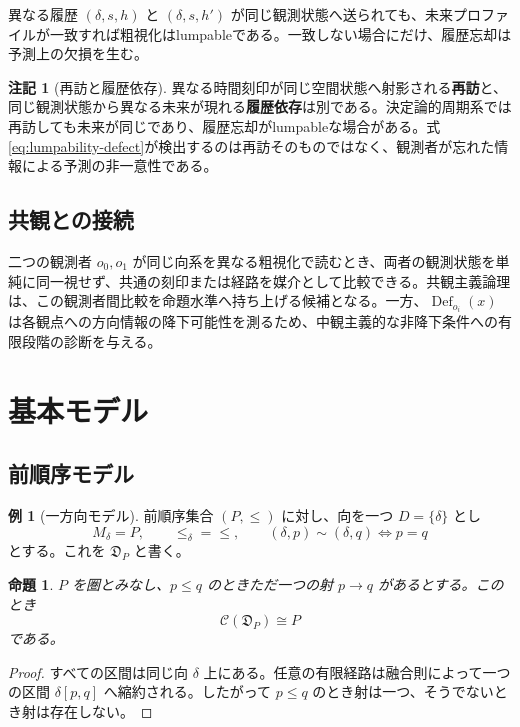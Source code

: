 \documentclass[a4paper,11pt]{ltjsarticle}
\theoremstyle{definition}
\newtheorem{remark}[definition]{注記}
\newtheorem{example}[definition]{例}
\theoremstyle{plain}
\newtheorem{proposition}[definition]{命題}
\newcommand{\Def}{\operatorname{Def}}
\begin{document}
異なる履歴 $(\delta,s,h)$ と $(\delta,s,h')$ が同じ観測状態へ送られても、未来プロファイルが一致すれば粗視化はlumpableである。一致しない場合にだけ、履歴忘却は予測上の欠損を生む。

\begin{remark}[再訪と履歴依存]
異なる時間刻印が同じ空間状態へ射影される\textbf{再訪}と、同じ観測状態から異なる未来が現れる\textbf{履歴依存}は別である。決定論的周期系では再訪しても未来が同じであり、履歴忘却がlumpableな場合がある。式\eqref{eq:lumpability-defect}が検出するのは再訪そのものではなく、観測者が忘れた情報による予測の非一意性である。
\end{remark}

\subsection{共観との接続}

二つの観測者 $o_0,o_1$ が同じ向系を異なる粗視化で読むとき、両者の観測状態を単純に同一視せず、共通の刻印または経路を媒介として比較できる。共観主義論理は、この観測者間比較を命題水準へ持ち上げる候補となる。一方、$\Def_{o_i}(x)$ は各観点への方向情報の降下可能性を測るため、中観主義的な非降下条件への有限段階の診断を与える。

\section{基本モデル}

\subsection{前順序モデル}

\begin{example}[一方向モデル]
前順序集合 $(P,\leq)$ に対し、向を一つ $D=\{\delta\}$ とし
\[
 M_\delta=P,
 \qquad
 \leq_\delta=\leq,
 \qquad
 (\delta,p)\sim(\delta,q)\Longleftrightarrow p=q
\]
とする。これを $\mathfrak D_P$ と書く。
\end{example}

\begin{proposition}
$P$ を圏とみなし、$p\leq q$ のときただ一つの射 $p\to q$ があるとする。このとき
\[
 \mathcal C(\mathfrak D_P)\cong P
\]
である。
\end{proposition}

\begin{proof}
すべての区間は同じ向 $\delta$ 上にある。任意の有限経路は融合則によって一つの区間 $\delta[p,q]$ へ縮約される。したがって $p\leq q$ のとき射は一つ、そうでないとき射は存在しない。
\end{proof}
\end{document}

